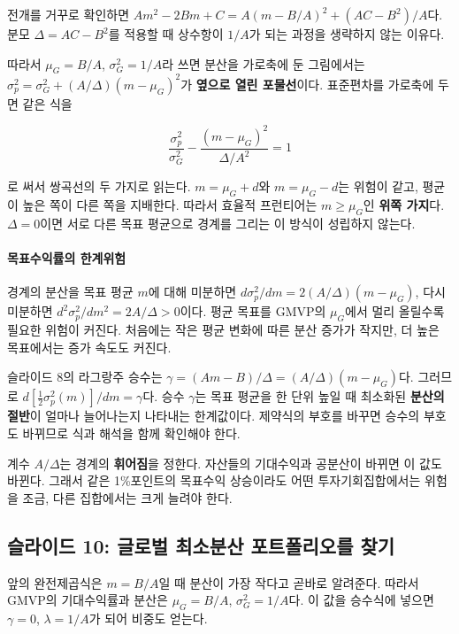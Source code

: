 \documentclass[11pt,a4paper]{article}
\begin{document}
전개를 거꾸로 확인하면 $Am^2-2Bm+C=A(m-B/A)^2+(AC-B^2)/A$다. 분모 $\Delta=AC-B^2$를 적용할 때 상수항이 $1/A$가 되는 과정을 생략하지 않는 이유다.
\par

따라서 $\mu_G=B/A$, $\sigma_G^2=1/A$라 쓰면 분산을 가로축에 둔 그림에서는 $\sigma_p^2=\sigma_G^2+(A/\Delta)(m-\mu_G)^2$가 \textbf{옆으로 열린 포물선}이다. 표준편차를 가로축에 두면 같은 식을
\par

\[
\frac{\sigma_p^2}{\sigma_G^2}
-\frac{(m-\mu_G)^2}{\Delta/A^2}=1
\]

로 써서 쌍곡선의 두 가지로 읽는다. $m=\mu_G+d$와 $m=\mu_G-d$는 위험이 같고, 평균이 높은 쪽이 다른 쪽을 지배한다. 따라서 효율적 프런티어는 $m\ge\mu_G$인 \textbf{위쪽 가지}다. $\Delta=0$이면 서로 다른 목표 평균으로 경계를 그리는 이 방식이 성립하지 않는다.
\par

\paragraph{목표수익률의 한계위험}

경계의 분산을 목표 평균 $m$에 대해 미분하면 $d\sigma_p^2/dm=2(A/\Delta)(m-\mu_G)$, 다시 미분하면 $d^2\sigma_p^2/dm^2=2A/\Delta>0$이다. 평균 목표를 GMVP의 $\mu_G$에서 멀리 올릴수록 필요한 위험이 커진다. 처음에는 작은 평균 변화에 따른 분산 증가가 작지만, 더 높은 목표에서는 증가 속도도 커진다.
\par

슬라이드 8의 라그랑주 승수는 $\gamma=(Am-B)/\Delta=(A/\Delta)(m-\mu_G)$다. 그러므로 $d[\tfrac12\sigma_p^2(m)]/dm=\gamma$다. 승수 $\gamma$는 목표 평균을 한 단위 높일 때 최소화된 \textbf{분산의 절반}이 얼마나 늘어나는지 나타내는 한계값이다. 제약식의 부호를 바꾸면 승수의 부호도 바뀌므로 식과 해석을 함께 확인해야 한다.
\par

계수 $A/\Delta$는 경계의 \textbf{휘어짐}을 정한다. 자산들의 기대수익과 공분산이 바뀌면 이 값도 바뀐다. 그래서 같은 1\%포인트의 목표수익 상승이라도 어떤 투자기회집합에서는 위험을 조금, 다른 집합에서는 크게 늘려야 한다.
\par

\subsection{슬라이드 10: 글로벌 최소분산 포트폴리오를 찾기}

앞의 완전제곱식은 $m=B/A$일 때 분산이 가장 작다고 곧바로 알려준다. 따라서 GMVP의 기대수익률과 분산은 $\mu_G=B/A$, $\sigma_G^2=1/A$다. 이 값을 승수식에 넣으면 $\gamma=0$, $\lambda=1/A$가 되어 비중도 얻는다.
\par
\end{document}
